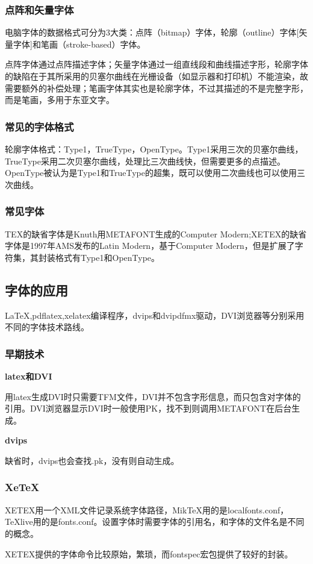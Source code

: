 \documentclass[16pt]{article}
\begin{document}
\subsubsection{点阵和矢量字体}
电脑字体的数据格式可分为3大类：点阵（bitmap）字体，轮廓（outline）字体[矢量字体]和笔画（stroke-based）字体。 \par
点阵字体通过点阵描述字体；矢量字体通过一组直线段和曲线描述字形，轮廓字体的缺陷在于其所采用的贝塞尔曲线在光栅设备（如显示器和打印机）不能渲染，故需要额外的补偿处理；笔画字体其实也是轮廓字体，不过其描述的不是完整字形，而是笔画，多用于东亚文字。
\subsubsection{常见的字体格式}
轮廓字体格式：Type1，TrueType，OpenType。Type1采用三次的贝塞尔曲线，TrueType采用二次贝塞尔曲线，处理比三次曲线快，但需要更多的点描述。OpenType被认为是Type1和TrueType的超集，既可以使用二次曲线也可以使用三次曲线。
\subsubsection{常见字体}
TEX的缺省字体是Knuth用METAFONT生成的Computer Modern;XETEX的缺省字体是1997年AMS发布的Latin Modern，基于Computer Modern，但是扩展了字符集，其封装格式有Type1和OpenType。

\subsection{字体的应用}
LaTeX,pdflatex,xelatex编译程序，dvips和dvipdfmx驱动，DVI浏览器等分别采用不同的字体技术路线。
\subsubsection{早期技术}
\textbf{latex和DVI} \par
用latex生成DVI时只需要TFM文件，DVI并不包含字形信息，而只包含对字体的引用。DVI浏览器显示DVI时一般使用PK，找不到则调用METAFONT在后台生成。
\par
\textbf{dvips} \par
缺省时，dvips也会查找.pk，没有则自动生成。

\subsubsection{XeTeX}
XETEX用一个XML文件记录系统字体路径，MikTeX用的是localfonts.conf，TeXlive用的是fonts.conf。设置字体时需要字体的引用名，和字体的文件名是不同的概念。\par
XETEX提供的字体命令比较原始，繁琐，而fontspec宏包提供了较好的封装。
\end{document}
